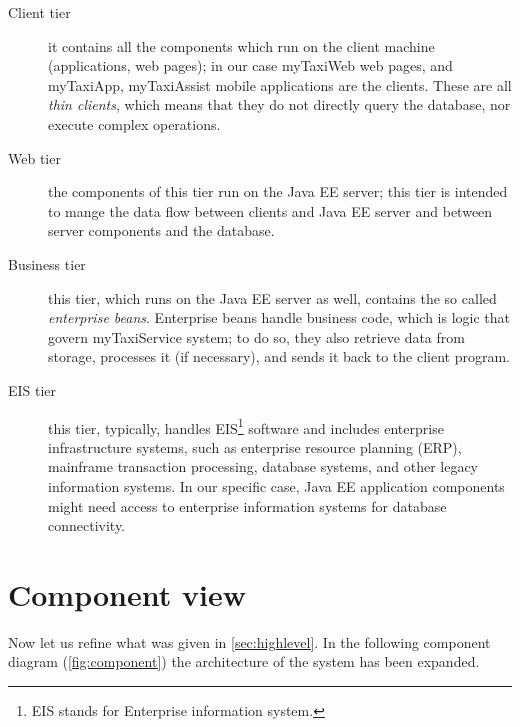 \begin{description}
	\item [Client tier] it contains all the components which run on the client machine (applications, web pages); in our case myTaxiWeb web pages, and myTaxiApp, myTaxiAssist mobile applications are the clients. These are all \emph{thin clients}, which means that they do not directly query the database, nor execute complex operations. 
	
	\item [Web tier] the components of this tier run on the Java EE server; this tier is intended to mange the data flow between clients and Java EE server and between server components and the database.

	\item [Business tier] this tier, which runs on the Java EE server as well, contains the so called \emph{enterprise beans}. Enterprise beans handle business code, which is logic that govern myTaxiService system; to do so, they also retrieve data from storage, processes it (if necessary), and sends it back to the client program.

	\item [EIS tier] this tier, typically, handles EIS\footnote{EIS stands for Enterprise information system.} software and includes enterprise infrastructure systems, such as enterprise resource planning (ERP), mainframe transaction processing, database systems, and other legacy information systems. In our specific case, Java EE application components might need access to enterprise information systems for database connectivity.
	
\end{description}













\section{Component view}\label{sec:componentView}

Now let us refine what was given in \cref{sec:highlevel}. In the following component diagram (\cref{fig:component}) the architecture of the system has been expanded.

